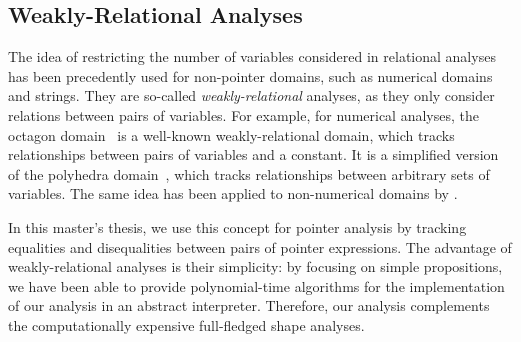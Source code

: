 \subsection{Weakly-Relational Analyses}

The idea of restricting the number of variables considered in relational analyses has been precedently used for non-pointer domains, such as numerical domains and strings.
They are so-called \emph{weakly-relational} analyses, as they only consider relations between pairs of variables.
For example, for numerical analyses, the octagon domain~\cite{octagon} is a well-known weakly-relational domain, which tracks relationships between pairs of variables and a constant.
It is a simplified version of the polyhedra domain~\cite{polyhedra}, which tracks relationships between arbitrary sets of variables.
The same idea has been applied to non-numerical domains by \textcite{SeidlETS2023}.

In this master's thesis, we use this concept for pointer analysis by tracking equalities and disequalities between pairs of pointer expressions.
The advantage of weakly-relational analyses is their simplicity: by focusing on simple propositions, we have been able to provide polynomial-time algorithms for the implementation of our analysis in an abstract interpreter.
Therefore, our analysis complements the computationally expensive full-fledged shape analyses.
